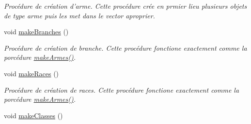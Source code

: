 \begin{DoxyCompactItemize}
\begin{DoxyCompactList}\small\item\em Procédure de création d'arme. Cette procédure crée en prmier lieu plusieurs objets de type arme puis les met dans le vector aproprier. \end{DoxyCompactList}\item 
\hypertarget{classInstancieur_a2c67514e27d7d051a19950aae5b09380}{void \hyperlink{classInstancieur_a2c67514e27d7d051a19950aae5b09380}{make\-Branches} ()}\label{classInstancieur_a2c67514e27d7d051a19950aae5b09380}

\begin{DoxyCompactList}\small\item\em Procédure de création de branche. Cette procédure fonctione exactement comme la porcédure \hyperlink{classInstancieur_acfc970b91c26ac5c29320f9d5ca73ee4}{make\-Armes()}. \end{DoxyCompactList}\item 
\hypertarget{classInstancieur_ab7990c0c53c0068a693da185c6db5a24}{void \hyperlink{classInstancieur_ab7990c0c53c0068a693da185c6db5a24}{make\-Races} ()}\label{classInstancieur_ab7990c0c53c0068a693da185c6db5a24}

\begin{DoxyCompactList}\small\item\em Procédure de création de races. Cette procédure fonctione exactement comme la porcédure \hyperlink{classInstancieur_acfc970b91c26ac5c29320f9d5ca73ee4}{make\-Armes()}. \end{DoxyCompactList}\item 
\hypertarget{classInstancieur_a741b7c3351b81bee26a09d7edceeae6f}{void \hyperlink{classInstancieur_a741b7c3351b81bee26a09d7edceeae6f}{make\-Classes} ()}\label{classInstancieur_a741b7c3351b81bee26a09d7edceeae6f}


\end{DoxyCompactItemize}
